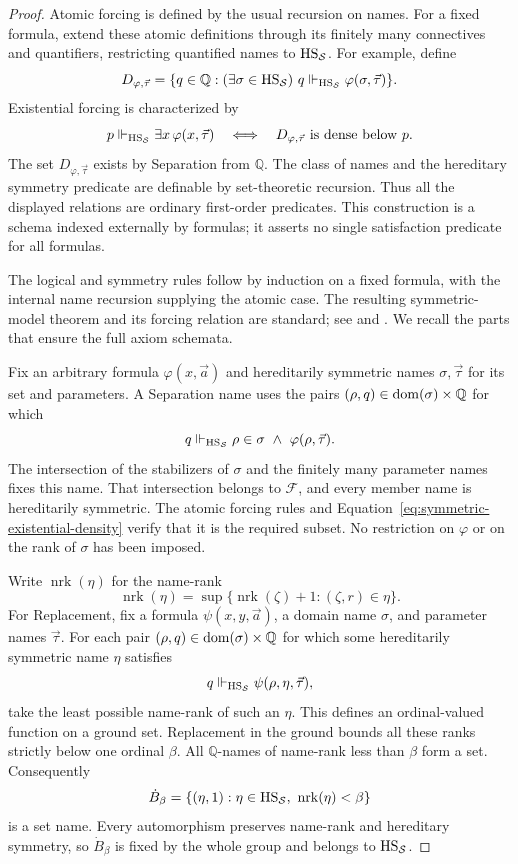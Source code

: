 \begin{proof}
Atomic forcing is defined by the usual recursion on names.
For a fixed formula, extend these atomic definitions through its
finitely many connectives and quantifiers, restricting quantified
names to $\mathrm{HS}_{\mathcal S}$. For example, define
\[
 D_{\varphi,\vec\tau}
 =\{q\in\mathbb Q:(\exists\sigma\in\mathrm{HS}_{\mathcal S})\
              q\Vdash_{\mathrm{HS}_{\mathcal S}}\varphi(\sigma,\vec\tau)\}.
\]
Existential forcing is characterized by
\begin{equation}\label{eq:symmetric-existential-density}
 p\Vdash_{\mathrm{HS}_{\mathcal S}}\exists x\,\varphi(x,\vec\tau)
 \quad\Longleftrightarrow\quad
 D_{\varphi,\vec\tau}\text{ is dense below }p.
\end{equation}
The set $D_{\varphi,\vec\tau}$ exists by Separation from $\mathbb Q$.
The class of names and the hereditary symmetry predicate are
definable by set-theoretic recursion. Thus all the displayed
relations are ordinary first-order predicates. This construction
is a schema indexed externally by formulas; it asserts no
single satisfaction predicate for all formulas.

The logical and symmetry rules follow by induction on a fixed
formula, with the internal name recursion supplying the atomic
case. The resulting symmetric-model theorem and its forcing
relation are standard; see
\cite[Equations~(15.39)--(15.41) and Lemma~15.51]{Jech2003}
and \cite[Section~2.1, p.~4]{Karagila2026}.
We recall the parts that ensure the full axiom schemata.

Fix an arbitrary formula $\varphi(x,\vec a)$ and
hereditarily symmetric names $\sigma,\vec\tau$ for its set and
parameters. A Separation name uses the pairs
$(\rho,q)\in\operatorname{dom}(\sigma)\times\mathbb Q$ for which
\[
 q\Vdash_{\mathrm{HS}_{\mathcal S}}
       \rho\in\sigma\ \wedge\ \varphi(\rho,\vec\tau).
\]
The intersection of the stabilizers of $\sigma$ and the finitely
many parameter names fixes this name. That intersection belongs
to $\mathcal F$, and every member name is hereditarily symmetric.
The atomic forcing rules and
Equation~\eqref{eq:symmetric-existential-density} verify that it
is the required subset. No restriction on $\varphi$ or on the
rank of $\sigma$ has been imposed.

Write $\operatorname{nrk}(\eta)$ for the name-rank
\[
 \operatorname{nrk}(\eta)=
 \sup\{\operatorname{nrk}(\zeta)+1:(\zeta,r)\in\eta\}.
\]
For Replacement, fix a formula $\psi(x,y,\vec a)$, a domain
name $\sigma$, and parameter names $\vec\tau$. For each pair
$(\rho,q)\in\operatorname{dom}(\sigma)\times\mathbb Q$ for which some
hereditarily symmetric name $\eta$ satisfies
\[
 q\Vdash_{\mathrm{HS}_{\mathcal S}}\psi(\rho,\eta,\vec\tau),
\]
take the least possible name-rank of such an $\eta$.
This defines an ordinal-valued function on a ground set.
Replacement in the ground bounds all these ranks strictly below
one ordinal $\beta$. All $\mathbb Q$-names of name-rank less
than $\beta$ form a set. Consequently
\[
 \dot B_\beta=
 \{(\eta,1):\eta\in\mathrm{HS}_{\mathcal S},\
                         \operatorname{nrk}(\eta)<\beta\}
\]
is a set name. Every automorphism preserves name-rank and
hereditary symmetry, so $\dot B_\beta$ is fixed by the whole
group and belongs to $\mathrm{HS}_{\mathcal S}$.


\end{proof}
